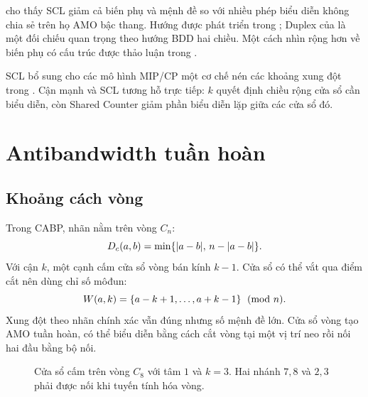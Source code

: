 \textcite{truong2025scamo} cho thấy SCL giảm cả biến phụ và mệnh đề so với
nhiều phép biểu diễn không chia sẻ trên họ AMO bậc thang. Hướng \AMK được phát triển trong
\textcite{truong2026ladderamk}; Duplex của \textcite{fazekas2020duplex} là một
đối chiếu quan trọng theo hướng BDD hai chiều. Một cách nhìn rộng hơn về biến
phụ có cấu trúc được thảo luận trong \textcite{haberlandt2023aux}.

SCL bổ sung cho các mô hình MIP/CP một cơ chế nén các khoảng xung đột trong
\CNF. Cận mạnh và SCL tương hỗ trực tiếp: \(k\) quyết định chiều rộng cửa sổ
cần biểu diễn, còn Shared Counter giảm phần biểu diễn lặp giữa các cửa sổ đó.

\section{Antibandwidth tuần hoàn}

\subsection{Khoảng cách vòng}

Trong CABP, nhãn nằm trên vòng \(C_n\):
\[
  D_c(a,b)=\min\{\lvert a-b\rvert,\,n-\lvert a-b\rvert\}.
\]
Với cận \(k\), một cạnh cấm cửa sổ vòng bán kính \(k-1\). Cửa sổ có thể vắt
qua điểm cắt nên dùng chỉ số môđun:
\[
  W(a,k)=\left\{a-k+1,\ldots,a+k-1\right\}\pmod n.
\]
Xung đột theo nhãn chính xác vẫn đúng nhưng số mệnh đề lớn. Cửa sổ vòng tạo
AMO tuần hoàn, có thể biểu diễn bằng cách cắt vòng tại một vị trí neo rồi nối hai
đầu bằng bộ nối.

\begin{figure}[tb]
\centering
{}
\caption{Cửa sổ cấm trên vòng \(C_8\) với tâm \(1\) và \(k=3\). Hai nhánh
\(7,8\) và \(2,3\) phải được nối khi tuyến tính hóa vòng.}
\label{fig:cabp-cyclic-window}
\end{figure}

